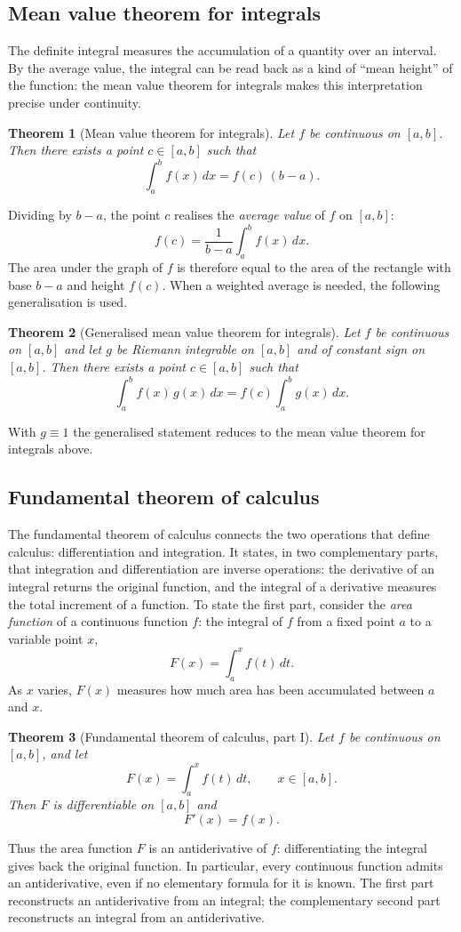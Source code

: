\documentclass[11pt,a4paper]{article}
\theoremstyle{definition} \newtheorem{definition}{Definition} \theoremstyle{plain} \newtheorem{theorem}{Theorem}
\begin{document}
\subsection{Mean value theorem for integrals}
The definite integral measures the accumulation of a quantity over an interval.
By the average value, the integral can be read back as a kind of ``mean height'' of the function: the mean value theorem for integrals makes this interpretation precise under continuity.
\begin{theorem}[Mean value theorem for integrals]\label{thm:mean-integral} Let $f$ be continuous on $[a,b]$.
Then there exists a point $c\in[a,b]$ such that \[ \int_a^b f(x)\,dx = f(c)\,(b-a). \] \end{theorem}
Dividing by $b-a$, the point $c$ realises the \emph{average value} of $f$ on $[a,b]$: \[ f(c) = \frac{1}{b-a}\int_a^b f(x)\,dx. \] The area under the graph of $f$ is therefore equal to the area of the rectangle with base $b-a$ and height $f(c)$.
When a weighted average is needed, the following generalisation is used.
\begin{theorem}[Generalised mean value theorem for integrals]\label{thm:generalized-mean-integral} Let $f$ be continuous on $[a,b]$ and let $g$ be Riemann integrable on $[a,b]$ and of constant sign on $[a,b]$.
Then there exists a point $c\in[a,b]$ such that \[ \int_a^b f(x)\,g(x)\,dx = f(c)\int_a^b g(x)\,dx. \] \end{theorem}
With $g\equiv 1$ the generalised statement reduces to the mean value theorem for integrals above.
\subsection{Fundamental theorem of calculus}
The fundamental theorem of calculus connects the two operations that define calculus: differentiation and integration.
It states, in two complementary parts, that integration and differentiation are inverse operations: the derivative of an integral returns the original function, and the integral of a derivative measures the total increment of a function.
To state the first part, consider the \emph{area function} of a continuous function $f$: the integral of $f$ from a fixed point $a$ to a variable point $x$, \[ F(x) = \int_a^x f(t)\,dt. \] As $x$ varies, $F(x)$ measures how much area has been accumulated between $a$ and $x$.
\begin{theorem}[Fundamental theorem of calculus, part I]\label{thm:ftc-one} Let $f$ be continuous on $[a,b]$, and let \[ F(x) = \int_a^x f(t)\,dt, \qquad x\in[a,b]. \] Then $F$ is differentiable on $[a,b]$ and \[ F'(x) = f(x). \] \end{theorem}
Thus the area function $F$ is an antiderivative of $f$: differentiating the integral gives back the original function.
In particular, every continuous function admits an antiderivative, even if no elementary formula for it is known.
The first part reconstructs an antiderivative from an integral; the complementary second part reconstructs an integral from an antiderivative.
\end{document}

